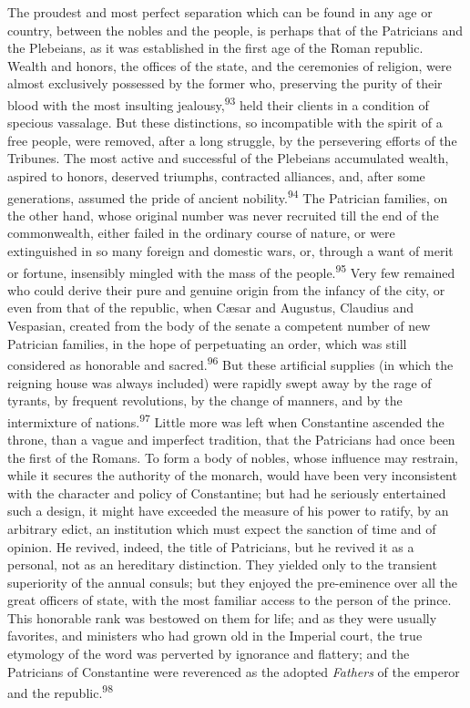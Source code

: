 The proudest and most perfect separation which can be found in
any age or country, between the nobles and the people, is perhaps
that of the Patricians and the Plebeians, as it was established
in the first age of the Roman republic. Wealth and honors, the
offices of the state, and the ceremonies of religion, were almost
exclusively possessed by the former who, preserving the purity of
their blood with the most insulting jealousy,\textsuperscript{93} held their
clients in a condition of specious vassalage. But these
distinctions, so incompatible with the spirit of a free people,
were removed, after a long struggle, by the persevering efforts
of the Tribunes. The most active and successful of the Plebeians
accumulated wealth, aspired to honors, deserved triumphs,
contracted alliances, and, after some generations, assumed the
pride of ancient nobility.\textsuperscript{94} The Patrician families, on the
other hand, whose original number was never recruited till the
end of the commonwealth, either failed in the ordinary course of
nature, or were extinguished in so many foreign and domestic
wars, or, through a want of merit or fortune, insensibly mingled
with the mass of the people.\textsuperscript{95} Very few remained who could
derive their pure and genuine origin from the infancy of the
city, or even from that of the republic, when Cæsar and Augustus,
Claudius and Vespasian, created from the body of the senate a
competent number of new Patrician families, in the hope of
perpetuating an order, which was still considered as honorable
and sacred.\textsuperscript{96} But these artificial supplies (in which the
reigning house was always included) were rapidly swept away by
the rage of tyrants, by frequent revolutions, by the change of
manners, and by the intermixture of nations.\textsuperscript{97} Little more was
left when Constantine ascended the throne, than a vague and
imperfect tradition, that the Patricians had once been the first
of the Romans. To form a body of nobles, whose influence may
restrain, while it secures the authority of the monarch, would
have been very inconsistent with the character and policy of
Constantine; but had he seriously entertained such a design, it
might have exceeded the measure of his power to ratify, by an
arbitrary edict, an institution which must expect the sanction of
time and of opinion. He revived, indeed, the title of Patricians,
but he revived it as a personal, not as an hereditary
distinction. They yielded only to the transient superiority of
the annual consuls; but they enjoyed the pre-eminence over all
the great officers of state, with the most familiar access to the
person of the prince. This honorable rank was bestowed on them
for life; and as they were usually favorites, and ministers who
had grown old in the Imperial court, the true etymology of the
word was perverted by ignorance and flattery; and the Patricians
of Constantine were reverenced as the adopted \textit{Fathers} of the
emperor and the republic.\textsuperscript{98}

